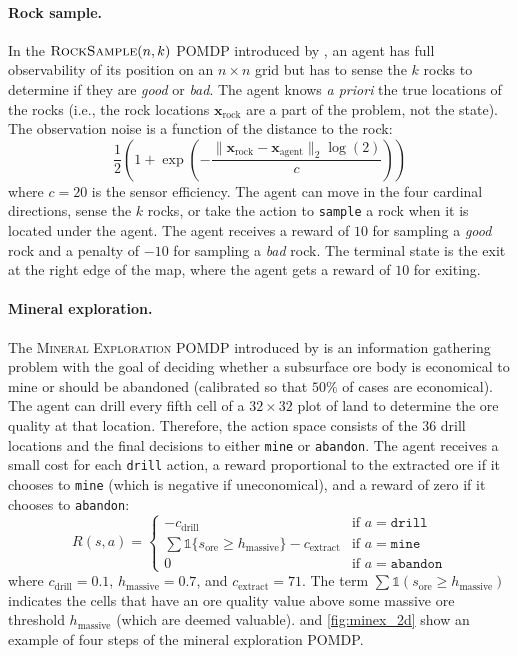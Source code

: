 \paragraph{Rock sample.}
In the $\textsc{RockSample}(n,k)$ POMDP introduced by \textcite{smith2004heuristic}, an agent has full observability of its position on an $n \times n$ grid but has to sense the $k$ rocks to determine if they are \textit{good} or \textit{bad}.
The agent knows \textit{a priori} the true locations of the rocks (i.e., the rock locations $\mathbf{x}_\text{rock}$ are a part of the problem, not the state).
The observation noise is a function of the distance to the rock:
\begin{equation}
   \frac{1}{2}\left(1 + \exp\left(-\frac{\lVert \mathbf{x}_\text{rock} - \mathbf{x}_\text{agent} \rVert_2 \log(2)}{c}\right)\right)
\end{equation}
where $c=20$ is the sensor efficiency.
The agent can move in the four cardinal directions, sense the $k$ rocks, or take the action to \texttt{sample} a rock when it is located under the agent.
The agent receives a reward of $10$ for sampling a \textit{good} rock and a penalty of $-10$ for sampling a \textit{bad} rock.
The terminal state is the exit at the right edge of the map, where the agent gets a reward of $10$ for exiting.


\paragraph{Mineral exploration.}
The \textsc{Mineral Exploration} POMDP introduced by \textcite{mern2023intelligent} is an information gathering problem with the goal of deciding whether a subsurface ore body is economical to mine or should be abandoned (calibrated so that $50\%$ of cases are economical).
The agent can drill every fifth cell of a $32 \times 32$ plot of land to determine the ore quality at that location.
Therefore, the action space consists of the $36$ drill locations and the final decisions to either \texttt{mine} or \texttt{abandon}.
The agent receives a small cost for each \texttt{drill} action, a reward proportional to the extracted ore if it chooses to \texttt{mine} (which is negative if uneconomical), and a reward of zero if it chooses to \texttt{abandon}:
\begin{equation}
R(s,a) = \begin{cases}
    -c_\text{drill} & \text{if } a=\texttt{drill}\\
    \displaystyle\sum\mathds{1}\{s_\text{ore} \ge h_\text{massive}\} - c_\text{extract} & \text{if } a=\texttt{mine}\\
    0 & \text{if } a=\texttt{abandon}
\end{cases}\label{eq:minex_reward}
\end{equation}
where $c_\text{drill}=0.1$, $h_\text{massive}=0.7$, and $c_\text{extract}=71$.
The term $\sum\mathds{1}(s_\text{ore} \ge h_\text{massive})$ indicates the cells that have an ore quality value above some massive ore threshold $h_\text{massive}$ (which are deemed valuable).
 and \cref{fig:minex_2d} show an example of four steps of the mineral exploration POMDP.


